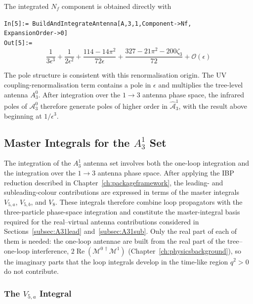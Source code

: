 The integrated $N_f$ component is obtained directly with

\begin{mdframed}[backgroundcolor=gray!10, linewidth=0pt]
\texttt{In[5]:= BuildAndIntegrateAntenna[A,3,1,Component->Nf,\\ExpansionOrder->0]}\\
\hfill
\texttt{Out[5]:=}
    \begin{equation*}
        \frac1{3\epsilon^3}+\frac1{2\epsilon^2}+\frac{114-14\pi^2}{72\epsilon}+\frac{327-21\pi^2-200\zeta_3}{72}+\mathcal O(\epsilon)
    \end{equation*}
\end{mdframed}

The pole structure is consistent with this renormalisation origin. The UV
coupling-renormalisation term contains a pole in $\epsilon$ and multiplies the
tree-level antenna $A_3^0$. After integration over the $1\to3$ antenna phase space,
the infrared poles of $\mathcal A_3^0$ therefore generate poles of higher order in
$\widehat{\mathcal A}_3^1$, with the result above beginning at $1/\epsilon^3$.

\subsection{Master Integrals for the $A_3^1$ Set}\label{subsec:A31mi}

The integration of the $A_3^1$ antenna set involves both the one-loop integration and
the integration over the $1\to3$ antenna phase space. After applying the IBP reduction
described in Chapter~\ref{ch:packageframework}, the leading- and subleading-colour
contributions are expressed in terms of the master integrals $V_{5,a}$, $V_{5,b}$, and
$V_8$. These integrals therefore combine loop propagators with the three-particle
phase-space integration and constitute the master-integral basis required for the
real--virtual antenna contributions considered in Sections~\ref{subsec:A31lead}
and~\ref{subsec:A31sub}. Only the real part of each of them is needed: the one-loop
antennae are built from the real part of the tree--one-loop interference,
$2\operatorname{Re}\!\left(\mathcal M^{0\,\dagger}\mathcal M^1\right)$
(Chapter~\ref{ch:physicsbackground}), so the imaginary parts that the loop integrals
develop in the time-like region $q^2>0$ do not contribute.

\subsubsection*{The $V_{5,a}$ Integral}

